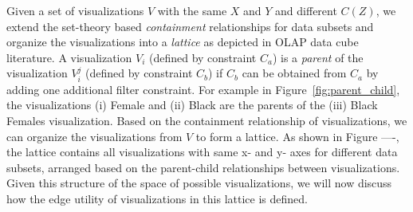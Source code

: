 \npar Given a set of visualizations $V$ with the same $X$ and $Y$ and different $C(Z)$, we extend the set-theory based \emph{containment} relationships for data subsets and organize the visualizations into a \textit{lattice} as depicted in OLAP data cube literature. A visualization $V_i$ (defined by constraint $C_a$) is a \textit{parent} of the visualization $V_i^j$ (defined by constraint $C_b$) if $C_b$ can be obtained from $C_a$ by adding one additional filter constraint. For example in Figure~\ref{fig:parent_child}, the visualizations (i) Female and (ii) Black are the parents of the (iii) Black Females visualization. Based on the containment relationship of visualizations, we can organize the visualizations from $V$ to form a lattice. As shown in Figure ----, the lattice contains all visualizations with same x- and y- axes for different data subsets, arranged based on the parent-child relationships between visualizations. Given this structure of the space of possible visualizations, we will now discuss how the edge utility of visualizations in this lattice is defined.


